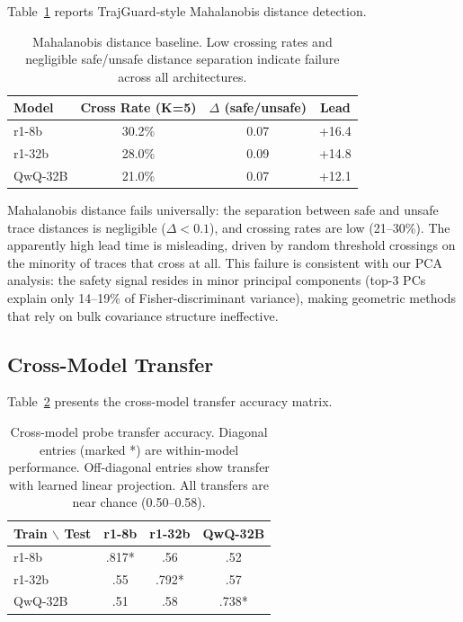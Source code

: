 \documentclass[11pt,a4paper]{article}
\begin{document}
Table~\ref{tab:mahal} reports TrajGuard-style Mahalanobis distance detection.

\begin{table}[t]
\centering
\small
\caption{Mahalanobis distance baseline. Low crossing rates and negligible safe/unsafe distance separation indicate failure across all architectures.}
\label{tab:mahal}
\begin{tabular}{lccc}
\toprule
Model & Cross Rate (K=5) & $\Delta$ (safe/unsafe) & Lead \\
\midrule
r1-8b & 30.2\% & 0.07 & +16.4 \\
r1-32b & 28.0\% & 0.09 & +14.8 \\
QwQ-32B & 21.0\% & 0.07 & +12.1 \\
\bottomrule
\end{tabular}
\end{table}

Mahalanobis distance fails universally: the separation between safe and unsafe trace distances is negligible ($\Delta < 0.1$), and crossing rates are low (21--30\%). The apparently high lead time is misleading, driven by random threshold crossings on the minority of traces that cross at all. This failure is consistent with our PCA analysis: the safety signal resides in minor principal components (top-3 PCs explain only 14--19\% of Fisher-discriminant variance), making geometric methods that rely on bulk covariance structure ineffective.

\subsection{Cross-Model Transfer}

Table~\ref{tab:transfer} presents the cross-model transfer accuracy matrix.

\begin{table}[t]
\centering
\small
\caption{Cross-model probe transfer accuracy. Diagonal entries (marked *) are within-model performance. Off-diagonal entries show transfer with learned linear projection. All transfers are near chance (0.50--0.58).}
\label{tab:transfer}
\begin{tabular}{lccc}
\toprule
Train $\backslash$ Test & r1-8b & r1-32b & QwQ-32B \\
\midrule
r1-8b & .817* & .56 & .52 \\
r1-32b & .55 & .792* & .57 \\
QwQ-32B & .51 & .58 & .738* \\
\bottomrule
\end{tabular}
\end{table}
\end{document}
